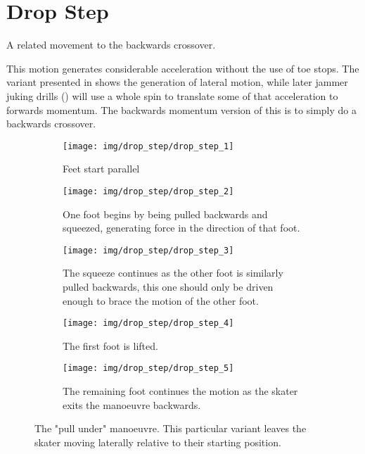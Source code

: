 \section{Drop Step}
\label{sec:crossovers/drop_step}
A related movement to the backwards crossover. 

This motion generates considerable acceleration without the use of toe stops.
The variant presented in  shows the generation of lateral motion, while later jammer juking drills () will use a whole spin to translate some of that acceleration to forwards momentum.    
The backwards momentum version of this is to simply do a backwards crossover.


\begin{figure}
\begin{subfigure}{0.3\linewidth}
\texttt{[image: img/drop\_step/drop\_step\_1]}
\caption{Feet start parallel}
\end{subfigure}
\begin{subfigure}{0.3\linewidth}
\texttt{[image: img/drop\_step/drop\_step\_2]}
\caption{One foot begins by being pulled backwards and squeezed, generating force in the direction of that foot.}
\end{subfigure}
\begin{subfigure}{0.3\linewidth}
\texttt{[image: img/drop\_step/drop\_step\_3]}
\caption{The squeeze continues as the other foot is similarly pulled backwards, this one should only be driven enough to brace the motion of the other foot.}     
\end{subfigure}
\begin{subfigure}{0.3\linewidth}
\texttt{[image: img/drop\_step/drop\_step\_4]}
\caption{The first foot is lifted.}
\end{subfigure}
\begin{subfigure}{0.3\linewidth}
\texttt{[image: img/drop\_step/drop\_step\_5]}
\caption{The remaining foot continues the motion as the skater exits the manoeuvre backwards.} 
\end{subfigure}
\caption{The "pull under" manoeuvre. This particular variant leaves the skater moving laterally relative to their starting position.  \label{fig:drop_step}}
\end{figure}
